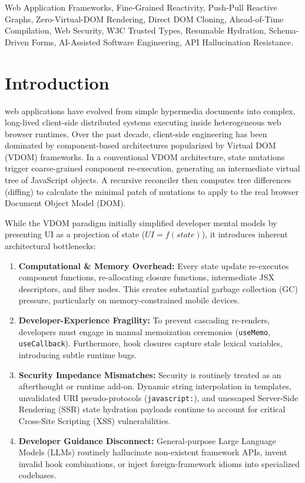 \documentclass[10pt,journal,compsoc]{IEEEtran}
\begin{document}
{\begin{IEEEkeywords}
Web Application Frameworks, Fine-Grained Reactivity, Push-Pull Reactive Graphs, Zero-Virtual-DOM Rendering, Direct DOM Cloning, Ahead-of-Time Compilation, Web Security, W3C Trusted Types, Resumable Hydration, Schema-Driven Forms, AI-Assisted Software Engineering, API Hallucination Resistance.
\end{IEEEkeywords}}

\maketitle
\IEEEdisplaynontitleabstractindextext
\IEEEpeerreviewmaketitle

\section{Introduction}
 web applications have evolved from simple hypermedia documents into complex, long-lived client-side distributed systems executing inside heterogeneous web browser runtimes. Over the past decade, client-side engineering has been dominated by component-based architectures popularized by Virtual DOM (VDOM) frameworks. In a conventional VDOM architecture, state mutations trigger coarse-grained component re-execution, generating an intermediate virtual tree of JavaScript objects. A recursive reconciler then computes tree differences (diffing) to calculate the minimal patch of mutations to apply to the real browser Document Object Model (DOM).

While the VDOM paradigm initially simplified developer mental models by presenting UI as a projection of state ($UI = f(state)$), it introduces inherent architectural bottlenecks:
\begin{enumerate}
    \item \textbf{Computational \& Memory Overhead:} Every state update re-executes component functions, re-allocating closure functions, intermediate JSX descriptors, and fiber nodes. This creates substantial garbage collection (GC) pressure, particularly on memory-constrained mobile devices.
    \item \textbf{Developer-Experience Fragility:} To prevent cascading re-renders, developers must engage in manual memoization ceremonies (\texttt{useMemo}, \texttt{useCallback}). Furthermore, hook closures capture stale lexical variables, introducing subtle runtime bugs.
    \item \textbf{Security Impedance Mismatches:} Security is routinely treated as an afterthought or runtime add-on. Dynamic string interpolation in templates, unvalidated URI pseudo-protocols (\texttt{javascript:}), and unescaped Server-Side Rendering (SSR) state hydration payloads continue to account for critical Cross-Site Scripting (XSS) vulnerabilities.
    \item \textbf{Developer Guidance Disconnect:} General-purpose Large Language Models (LLMs) routinely hallucinate non-existent framework APIs, invent invalid hook combinations, or inject foreign-framework idioms into specialized codebases.
\end{enumerate}
\end{document}
